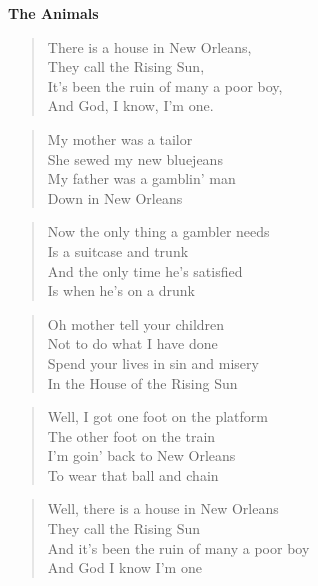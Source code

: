 \documentclass[9pt,a4paper,oneside, onecolumn]{article}
\begin{document}
\begin{multicols}{2}
\raggedcolumns
\textbf{The Animals}
\begin{verse}   
There \Am{}is a \C{}house in \D{}New Or\F{}leans,\\
They \Am{}call the \C{}Rising \E{}Sun,\Es{}\\
It's \Am{}been the \C{}ruin of \D{}many a poor \F{}boy,\\
And \Am{}God, I \E{}know, I'm \Am{}one.\Es{}\\
\end{verse}

\begin{verse}
My mother was a tailor\\
She sewed my new bluejeans\\
My father was a gamblin' man\\
Down in New Orleans\\
\end{verse}

\begin{verse}
Now the only thing a gambler needs\\
Is a suitcase and trunk\\
And the only time he's satisfied\\
Is when he's on a drunk\\
\end{verse}

\begin{verse}
Oh mother tell your children\\
Not to do what I have done\\
Spend your lives in sin and misery\\
In the House of the Rising Sun\\
\end{verse}

\begin{verse}
Well, I got one foot on the platform\\
The other foot on the train\\
I'm goin' back to New Orleans\\
To wear that ball and chain\\
\end{verse}

\begin{verse}
Well, there is a house in New Orleans\\
They call the Rising Sun\\
And it's been the ruin of many a poor boy\\
And God I know I'm one\\
\end{verse}


\end{multicols}
\end{document}
